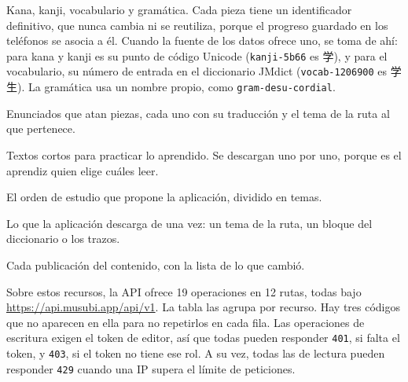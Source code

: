 \documentclass[11pt]{article}
\begin{document}
\begin{description}
  \raggedright
  \item[Piezas.] Kana, kanji, vocabulario y gramática. Cada pieza tiene un identificador definitivo, que nunca cambia ni se reutiliza, porque el progreso guardado en los teléfonos se asocia a él. Cuando la fuente de los datos ofrece uno, se toma de ahí: para kana y kanji es su punto de código Unicode (\texttt{kanji-5b66} es 学), y para el vocabulario, su número de entrada en el diccionario JMdict (\texttt{vocab-1206900} es 学生). La gramática usa un nombre propio, como \texttt{gram-desu-cordial}.
  \item[Frases.] Enunciados que atan piezas, cada uno con su traducción y el tema de la ruta al que pertenece.
  \item[Lecturas.] Textos cortos para practicar lo aprendido. Se descargan uno por uno, porque es el aprendiz quien elige cuáles leer.
  \item[Ruta.] El orden de estudio que propone la aplicación, dividido en temas.
  \item[Paquetes.] Lo que la aplicación descarga de una vez: un tema de la ruta, un bloque del diccionario o los trazos.
  \item[Versiones.] Cada publicación del contenido, con la lista de lo que cambió.
\end{description}

Sobre estos recursos, la API ofrece 19 operaciones en 12 rutas, todas bajo \url{https://api.musubi.app/api/v1}. La tabla las agrupa por recurso. Hay tres códigos que no aparecen en ella para no repetirlos en cada fila. Las operaciones de escritura exigen el token de editor, así que todas pueden responder \texttt{401}, si falta el token, y \texttt{403}, si el token no tiene ese rol. A su vez, todas las de lectura pueden responder \texttt{429} cuando una IP supera el límite de peticiones.
\end{document}
